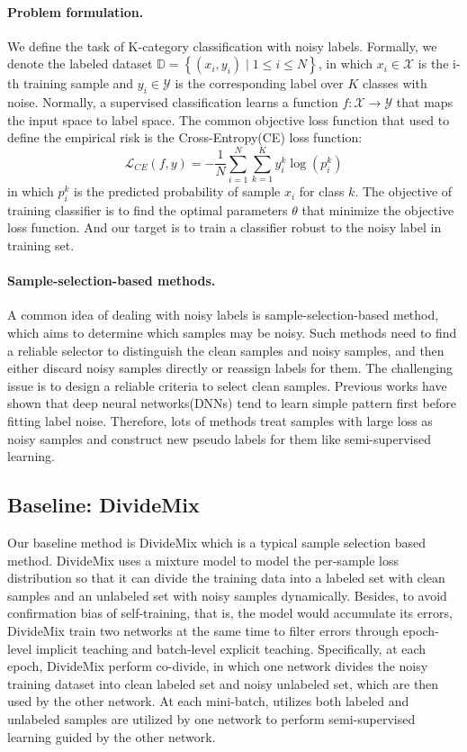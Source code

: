 \documentclass[10pt,twocolumn,letterpaper]{article}
\begin{document}
\paragraph{Problem formulation.}We define the task of K-category classification with noisy labels. Formally, we denote the labeled dataset $\mathbb{D}=\left\{\left(x_{i}, y_{i}\right) \mid 1 \leq i \leq N\right\}$, in which $ x_{i} \in \mathcal{X}$ is the i-th training sample and $ y_{i} \in \mathcal{Y}$ is the corresponding label over $ K $ classes with noise. Normally, a supervised classification learns a function $f: \mathcal{X} \rightarrow \mathcal{Y}$ that maps the input space to label space. The common objective loss function that used to define the empirical risk is the Cross-Entropy(CE) loss function:
\begin{equation}\label{ce}
\mathcal{L}_{C E}(f,y)=-\frac{1}{N} \sum_{i=1}^{N} \sum_{k=1}^{K} y_{i}^{k} \log \left(p_{i}^{k}\right)
\end{equation}
in which $ p_{i}^{k} $ is the predicted probability of sample $ x_{i} $ for class $ k $. The objective of training classifier is to find the optimal parameters $ \theta $ that minimize the objective loss function. And our target is to train a classifier robust to the noisy label in training set.
\paragraph{Sample-selection-based methods.} A common idea of dealing with noisy labels is sample-selection-based method, which aims to determine which samples may be noisy. Such methods need to find a reliable selector to distinguish the clean samples and noisy samples, and then either discard noisy samples directly or reassign labels for them. The challenging issue is to design a reliable criteria to select clean samples. Previous works have shown that deep neural networks(DNNs) tend to learn simple pattern first before fitting label noise\cite{arpit2017closer}. Therefore, lots of methods treat samples with large loss as noisy samples and construct new pseudo labels for them like semi-supervised learning.
\subsection{Baseline: DivideMix}
Our baseline method is DivideMix\cite{li2020dividemix} which is a typical sample selection based method. DivideMix uses a mixture model to model the per-sample loss distribution so that it can divide the training data into a labeled set with clean samples and an unlabeled set with noisy samples dynamically. Besides, to avoid confirmation bias of self-training, that is, the model would accumulate its errors, DivideMix train two networks at the same time to filter errors through epoch-level implicit teaching and batch-level explicit teaching. Specifically, at each epoch, DivideMix perform co-divide, in which one network divides the noisy training dataset into clean labeled set and noisy unlabeled set, which are then used by the other network. At each mini-batch, utilizes both labeled and unlabeled samples are utilized by one network to perform semi-supervised learning guided by the other network. 
\end{document}
